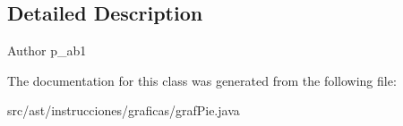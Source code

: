 \subsection{Detailed Description}
\begin{DoxyAuthor}{Author}
p\+\_\+ab1 
\end{DoxyAuthor}


The documentation for this class was generated from the following file\+:\begin{DoxyCompactItemize}
\item 
src/ast/instrucciones/graficas/graf\+Pie.\+java\end{DoxyCompactItemize}
